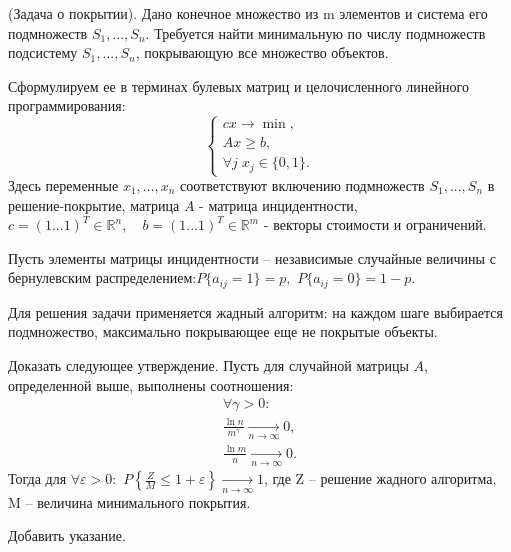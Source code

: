 \begin{problem}

(Задача о покрытии). Дано конечное множество из m элементов и система его подмножеств $S_{1} ,...,S_{n} $. Требуется найти минимальную по числу подмножеств подсистему $S_{1} ,...,S_{n} $, покрывающую все множество объектов. 

\noindent Сформулируем ее в терминах булевых матриц и целочисленного линейного программирования:
\[\left\{\begin{array}{l} {cx\to \min ,} \\ {Ax\ge b,} \\ {\forall j\; x_{j} \in \{ 0,1\} .} \end{array}\right. \] 
Здесь переменные $x_{1} ,...,x_{n} $ соответствуют включению подмножеств $S_{1} ,...,S_{n} $ в решение-покрытие, матрица $A$ - матрица инцидентности, $c=(1...1)^{T} \in {\mathbb R}^{n} ,\quad b=(1...1)^{T} \in {\mathbb R}^{m} $ - векторы стоимости и ограничений.

\noindent Пусть элементы матрицы инцидентности -- независимые случайные величины с бернулевским распределением:$P\{ a_{ij} =1\} =p,$ $P\{ a_{ij} =0\} =1-p$. 

\noindent Для решения задачи применяется жадный алгоритм: на каждом шаге выбирается подмножество, максимально покрывающее еще не покрытые объекты. 

Доказать следующее утверждение. Пусть для случайной матрицы $A$, определенной выше, выполнены соотношения:
\[\begin{array}{l} {\forall \gamma >0:} \\ {\frac{\ln n}{m^{\gamma } } \mathop{\to }\limits_{n\to \infty } 0,} \\ {\frac{\ln m}{n} \mathop{\to }\limits_{n\to \infty } 0.} \end{array}\] 
Тогда для $\forall \varepsilon >0:$ $P\left\{\frac{Z}{M} \le 1+\varepsilon \right\}\mathop{\to }\limits_{n\to \infty } 1$, где Z -- решение жадного алгоритма, M -- величина минимального покрытия. 

\begin{fixme}
Добавить указание.
\end{fixme}

\end{problem}

